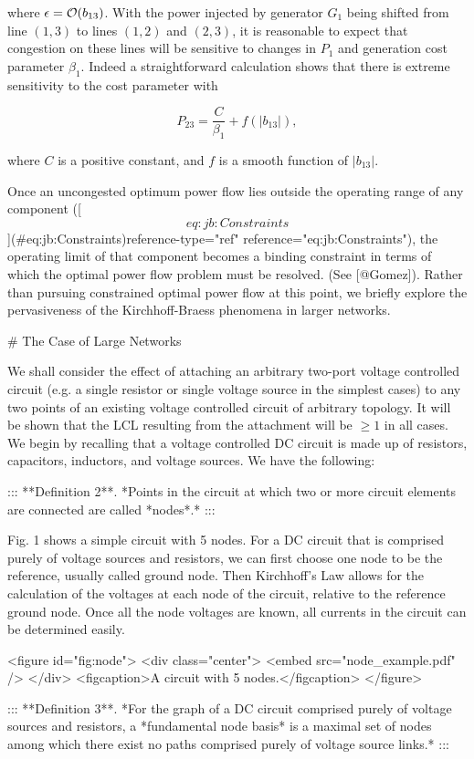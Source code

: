 where $\epsilon={\cal O}(b_{13})$. With the power injected by generator $G_1$ being shifted from line $(1,3)$ to lines $(1,2)$ and $(2,3)$, it is reasonable to expect that congestion on these lines will be sensitive to changes in $P_1$ and generation cost parameter $\beta_1$. Indeed a straightforward calculation shows that there is extreme sensitivity to the cost parameter with

$$P_{23} = \frac{C}{\beta_1} + f(|b_{13}|),$$

where $C$ is a positive constant, and $f$ is a smooth function of $|b_{13}|$.

Once an uncongested optimum power flow lies outside the operating range of any component ([\[eq:jb:Constraints\]](#eq:jb:Constraints){reference-type="ref" reference="eq:jb:Constraints"}), the operating limit of that component becomes a binding constraint in terms of which the optimal power flow problem must be resolved. (See [@Gomez]). Rather than pursuing constrained optimal power flow at this point, we briefly explore the pervasiveness of the Kirchhoff-Braess phenomena in larger networks.

# The Case of Large Networks

We shall consider the effect of attaching an arbitrary two-port voltage controlled circuit (e.g. a single resistor or single voltage source in the simplest cases) to any two points of an existing voltage controlled circuit of arbitrary topology. It will be shown that the LCL resulting from the attachment will be $\ge 1$ in all cases. We begin by recalling that a voltage controlled DC circuit is made up of resistors, capacitors, inductors, and voltage sources. We have the following:

::: **Definition 2**. *Points in the circuit at which two or more circuit elements are connected are called *nodes*.* :::

Fig. 1 shows a simple circuit with 5 nodes. For a DC circuit that is comprised purely of voltage sources and resistors, we can first choose one node to be the reference, usually called ground node. Then Kirchhoff's Law allows for the calculation of the voltages at each node of the circuit, relative to the reference ground node. Once all the node voltages are known, all currents in the circuit can be determined easily.

<figure id="fig:node"> <div class="center"> <embed src="node_example.pdf" /> </div> <figcaption>A circuit with 5 nodes.</figcaption> </figure>

::: **Definition 3**. *For the graph of a DC circuit comprised purely of voltage sources and resistors, a *fundamental node basis* is a maximal set of nodes among which there exist no paths comprised purely of voltage source links.* :::

